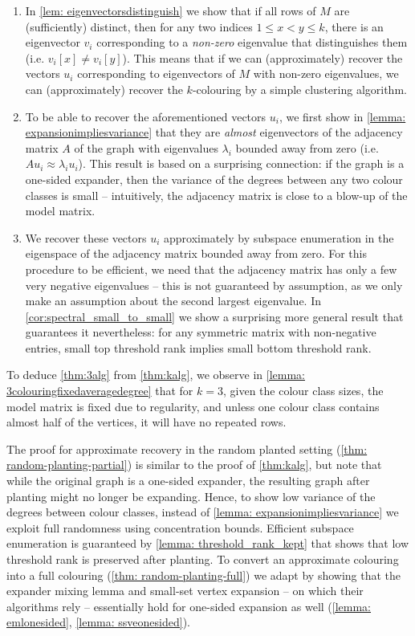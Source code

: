 \begin{enumerate}
    \item In \cref{lem: eigenvectorsdistinguish} we show that if all rows of $M$ are (sufficiently) distinct, then for any two indices $1\leq x<y\leq k$, there is an eigenvector $v_i$ corresponding to a \textit{non-zero} eigenvalue that distinguishes them (i.e. $v_i[x]\neq v_i[y]$). This means that if we can (approximately) recover the vectors $u_i$ corresponding to eigenvectors of $M$ with non-zero eigenvalues, we can (approximately) recover the $k$-colouring by a simple clustering algorithm.
    \item To be able to recover the aforementioned vectors $u_i$, we first show in \cref{lemma: expansionimpliesvariance} that they are \textit{almost} eigenvectors of the adjacency matrix $A$ of the graph with eigenvalues $\lambda_i$ bounded away from zero (i.e. $Au_i\approx \lambda_i u_i$). This result is based on a surprising connection: if the graph is a one-sided expander, then the variance of the degrees between any two colour classes is small -- intuitively, the adjacency matrix is close to a blow-up of the model matrix.
    \item We recover these vectors $u_i$ approximately by subspace enumeration in the eigenspace of the adjacency matrix bounded away from zero. For this procedure to be efficient, we need that the adjacency matrix has only a few very negative eigenvalues -- this is not guaranteed by assumption, as we only make an assumption about the second largest eigenvalue. In \cref{cor:spectral_small_to_small} we show a surprising more general result that guarantees it nevertheless: for any symmetric matrix with non-negative entries, small top threshold rank implies small bottom threshold rank.
\end{enumerate}


To deduce \cref{thm:3alg} from \cref{thm:kalg}, we observe in \cref{lemma: 3colouringfixedaveragedegree} that for $k=3$, given the colour class sizes, the model matrix is fixed due to regularity, and unless one colour class contains almost half of the vertices, it will have no repeated rows. 

The proof for approximate recovery in the random planted setting (\cref{thm: random-planting-partial}) is similar to the proof of \cref{thm:kalg}, but note that while the original graph is a one-sided expander, the resulting graph after planting might no longer be expanding. Hence, to show low variance of the degrees between colour classes, instead of \cref{lemma: expansionimpliesvariance} we exploit full randomness using concentration bounds. Efficient subspace enumeration is guaranteed by \cref{lemma: threshold_rank_kept} that shows that low threshold rank is preserved after planting. To convert an approximate colouring into a full colouring (\cref{thm: random-planting-full}) we adapt \cite{MR3536556-David16} by showing that the expander mixing lemma and small-set vertex expansion -- on which their algorithms rely -- essentially hold for one-sided expansion as well (\cref{lemma: emlonesided}, \cref{lemma: ssveonesided}).

